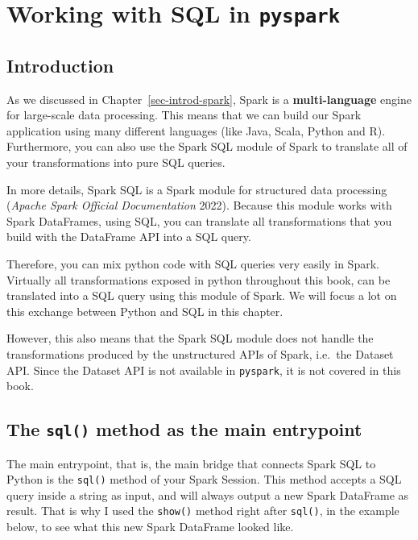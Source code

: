 \documentclass[
  11pt,
  letterpaper,
  DIV=11,
  numbers=noendperiod]{scrreprt}
\begin{document}

\hypertarget{working-with-sql-in-pyspark}{%
\chapter{\texorpdfstring{Working with SQL in
\texttt{pyspark}}{Working with SQL in pyspark}}\label{working-with-sql-in-pyspark}}

\hypertarget{introduction-6}{%
\section{Introduction}\label{introduction-6}}

As we discussed in Chapter~\ref{sec-introd-spark}, Spark is a
\textbf{multi-language} engine for large-scale data processing. This
means that we can build our Spark application using many different
languages (like Java, Scala, Python and R). Furthermore, you can also
use the Spark SQL module of Spark to translate all of your
transformations into pure SQL queries.

In more details, Spark SQL is a Spark module for structured data
processing (\emph{Apache Spark Official Documentation} 2022). Because
this module works with Spark DataFrames, using SQL, you can translate
all transformations that you build with the DataFrame API into a SQL
query.

Therefore, you can mix python code with SQL queries very easily in
Spark. Virtually all transformations exposed in python throughout this
book, can be translated into a SQL query using this module of Spark. We
will focus a lot on this exchange between Python and SQL in this
chapter.

However, this also means that the Spark SQL module does not handle the
transformations produced by the unstructured APIs of Spark, i.e.~the
Dataset API. Since the Dataset API is not available in \texttt{pyspark},
it is not covered in this book.

\hypertarget{the-sql-method-as-the-main-entrypoint}{%
\section{\texorpdfstring{The \texttt{sql()} method as the main
entrypoint}{The sql() method as the main entrypoint}}\label{the-sql-method-as-the-main-entrypoint}}

The main entrypoint, that is, the main bridge that connects Spark SQL to
Python is the \texttt{sql()} method of your Spark Session. This method
accepts a SQL query inside a string as input, and will always output a
new Spark DataFrame as result. That is why I used the \texttt{show()}
method right after \texttt{sql()}, in the example below, to see what
this new Spark DataFrame looked like.
\end{document}
